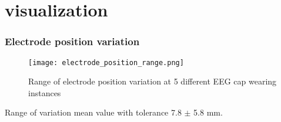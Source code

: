 \section{visualization}
\begin{frame}
	\frametitle{Electrode position variation}
	\begin{figure}[ht!]
		\centering
		\texttt{[image: electrode\_position\_range.png]}
		\caption{Range of electrode position variation at 5 different EEG cap wearing instances} 
		\label{fig:electrode_position_range}
	\end{figure}
		
\begin{block}{Range of variation}
	mean value with tolerance  7.8 $\pm$ 5.8 mm.
\end{block}

\end{frame}


 